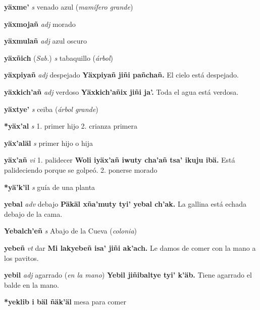 \documentclass[10pt]{scrbook}
\newcommand{\entry}[1]{\textbf{#1}}
\newcommand{\onedefinition}[1]{#1.}
\newcommand{\partofspeech}[1]{\textit{#1}}
\newcommand{\spanishtranslation}[1]{#1}
\newcommand{\clarification}[1]{(\textit{#1})}
\newcommand{\cholexample}[1]{\textbf{#1}}
\newcommand{\exampletranslation}[1]{#1}
\newcommand{\relevantdialect}[1]{(\textit{#1})}
\begin{document}
\begin{multicols}{2}
\entry{yäxme'}
\partofspeech{s}
\spanishtranslation{venado azul}
\clarification{mamífero grande}

\entry{yäxmojañ}
\partofspeech{adj}
\spanishtranslation{morado}

\entry{yäxmulañ}
\partofspeech{adj}
\spanishtranslation{azul oscuro}

\entry{yäxñich}
\relevantdialect{Sab.}
\partofspeech{s}
\spanishtranslation{tabaquillo}
\clarification{árbol}

\entry{yäxpiyañ}
\partofspeech{adj}
\spanishtranslation{despejado}
\cholexample{Yäxpiyañ jiñi pañchañ.}
\exampletranslation{El cielo está despejado.}

\entry{yäxkich'añ}
\partofspeech{adj}
\spanishtranslation{verdoso}
\cholexample{Yäxkich'añix jiñi ja'.}
\exampletranslation{Toda el agua está verdosa.}

\entry{yäxtye'}
\partofspeech{s}
\spanishtranslation{ceiba}
\clarification{árbol grande}

\entry{*yäx'al}
\partofspeech{s}
\onedefinition{1}
\spanishtranslation{primer hijo}
\onedefinition{2}
\spanishtranslation{crianza primera}

\entry{yäx'aläl}
\partofspeech{s}
\spanishtranslation{primer hijo o hija}

\entry{yäx'añ}
\partofspeech{vi}
\onedefinition{1}
\spanishtranslation{palidecer}
\cholexample{Woli iyäx'añ iwuty cha'añ tsa' ikuju ibä.}
\exampletranslation{Está palideciendo porque se golpeó.}
\onedefinition{2}
\spanishtranslation{ponerse morado}

\entry{*yä'k'il}
\partofspeech{s}
\spanishtranslation{guía de una planta}

\entry{yebal}
\partofspeech{adv}
\spanishtranslation{debajo}
\cholexample{Päkäl xña'muty tyi' yebal ch'ak.}
\exampletranslation{La gallina está echada debajo de la cama.}

\entry{Yebalch'eñ}
\partofspeech{s}
\spanishtranslation{Abajo de la Cueva}
\clarification{colonia}

\entry{yebeñ}
\partofspeech{vt}
\spanishtranslation{dar}
\cholexample{Mi lakyebeñ isa' jiñi ak'ach.}
\exampletranslation{Le damos de comer con la mano a los pavitos.}

\entry{yebil}
\partofspeech{adj}
\spanishtranslation{agarrado}
\clarification{en la mano}
\cholexample{Yebil jiñibaltye tyi' k'äb.}
\exampletranslation{Tiene agarrado el balde en la mano.}

\entry{*yeklib i bäl ñäk'äl}
\spanishtranslation{mesa para comer}


\end{multicols}
\end{document}
